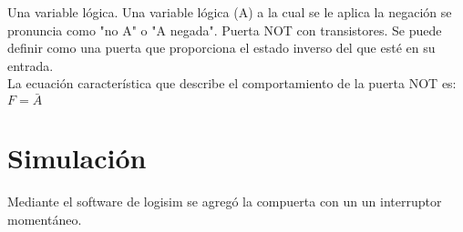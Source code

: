 \documentclass[]{article}
\begin{document}
Una variable lógica. Una variable lógica (A) a la cual se le aplica la negación se pronuncia como "no A" o "A negada".
Puerta NOT con transistores. Se puede definir como una puerta que proporciona el estado inverso del que esté en su entrada. \\

La ecuación característica que describe el comportamiento de la puerta NOT es: $F=\bar{A}$ \\




\section{Simulación}

Mediante el software de logisim se agregó la compuerta con un un interruptor momentáneo.\\





%
%
\end{document}
